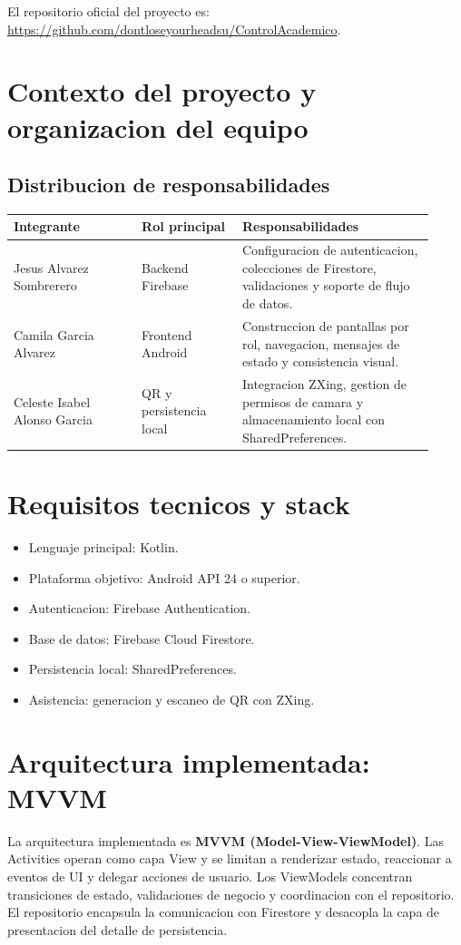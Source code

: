\documentclass[12pt,a4paper]{article}
\begin{document}
El repositorio oficial del proyecto es: \url{https://github.com/dontloseyourheadsu/ControlAcademico}.

\section{Contexto del proyecto y organizacion del equipo}
\subsection*{Distribucion de responsabilidades}
\begin{longtable}{>{\raggedright\arraybackslash}p{0.28\linewidth} >{\raggedright\arraybackslash}p{0.22\linewidth} >{\raggedright\arraybackslash}p{0.42\linewidth}}
\toprule
\textbf{Integrante} & \textbf{Rol principal} & \textbf{Responsabilidades} \\
\midrule
Jesus Alvarez Sombrerero & Backend Firebase & Configuracion de autenticacion, colecciones de Firestore, validaciones y soporte de flujo de datos. \\
Camila Garcia Alvarez & Frontend Android & Construccion de pantallas por rol, navegacion, mensajes de estado y consistencia visual. \\
Celeste Isabel Alonso Garcia & QR y persistencia local & Integracion ZXing, gestion de permisos de camara y almacenamiento local con SharedPreferences. \\
\bottomrule
\end{longtable}

\section{Requisitos tecnicos y stack}
\begin{itemize}[leftmargin=*]
    \item Lenguaje principal: Kotlin.
    \item Plataforma objetivo: Android API 24 o superior.
    \item Autenticacion: Firebase Authentication.
    \item Base de datos: Firebase Cloud Firestore.
    \item Persistencia local: SharedPreferences.
    \item Asistencia: generacion y escaneo de QR con ZXing.
\end{itemize}

\section{Arquitectura implementada: MVVM}
La arquitectura implementada es \textbf{MVVM (Model-View-ViewModel)}. Las Activities operan como capa View y se limitan a renderizar estado, reaccionar a eventos de UI y delegar acciones de usuario. Los ViewModels concentran transiciones de estado, validaciones de negocio y coordinacion con el repositorio. El repositorio encapsula la comunicacion con Firestore y desacopla la capa de presentacion del detalle de persistencia.
\end{document}
